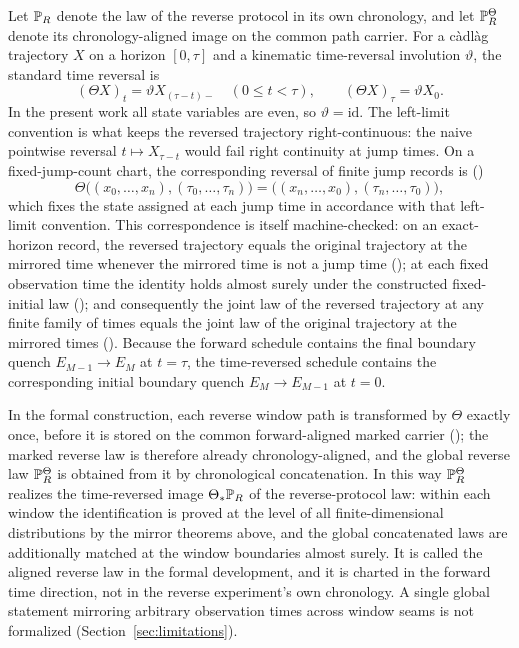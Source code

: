 Let $\mathbb{P}_R$ denote the law of the reverse protocol in its own chronology, and let $\mathbb{P}_R^{\Theta}$ denote its chronology-aligned image on the common path carrier. For a c\`adl\`ag trajectory $X$ on a horizon $[0,\tau]$ and a kinematic time-reversal involution $\vartheta$, the standard time reversal is \parencite{MaesNetocny2003,SpinneyFord2012}
\[
  (\Theta X)_t=\vartheta X_{(\tau-t)-}\quad(0\le t<\tau),
  \qquad
  (\Theta X)_\tau=\vartheta X_0 .
\]
In the present work all state variables are even, so $\vartheta=\mathrm{id}$. The left-limit convention is what keeps the reversed trajectory right-continuous: the naive pointwise reversal $t\mapsto X_{\tau-t}$ would fail right continuity at jump times. On a fixed-jump-count chart, the corresponding reversal of finite jump records is ()
\begin{equation}
\label{eq:reversal}
  \Theta\bigl((x_0,\ldots,x_n),(\tau_0,\ldots,\tau_n)\bigr)
  = \bigl((x_n,\ldots,x_0),(\tau_n,\ldots,\tau_0)\bigr),
\end{equation}
which fixes the state assigned at each jump time in accordance with that left-limit convention. This correspondence is itself machine-checked: on an exact-horizon record, the reversed trajectory equals the original trajectory at the mirrored time whenever the mirrored time is not a jump time (); at each fixed observation time the identity holds almost surely under the constructed fixed-initial law (); and consequently the joint law of the reversed trajectory at any finite family of times equals the joint law of the original trajectory at the mirrored times (). Because the forward schedule contains the final boundary quench $E_{M-1}\to E_M$ at $t=\tau$, the time-reversed schedule contains the corresponding initial boundary quench $E_M\to E_{M-1}$ at $t=0$.

In the formal construction, each reverse window path is transformed by $\Theta$ exactly once, before it is stored on the common forward-aligned marked carrier (); the marked reverse law is therefore already chronology-aligned, and the global reverse law $\mathbb{P}_R^{\Theta}$ is obtained from it by chronological concatenation. In this way $\mathbb{P}_R^{\Theta}$ realizes the time-reversed image $\Theta_*\mathbb{P}_R$ of the reverse-protocol law: within each window the identification is proved at the level of all finite-dimensional distributions by the mirror theorems above, and the global concatenated laws are additionally matched at the window boundaries almost surely. It is called the aligned reverse law in the formal development, and it is charted in the forward time direction, not in the reverse experiment's own chronology. A single global statement mirroring arbitrary observation times across window seams is not formalized (Section~\ref{sec:limitations}).

